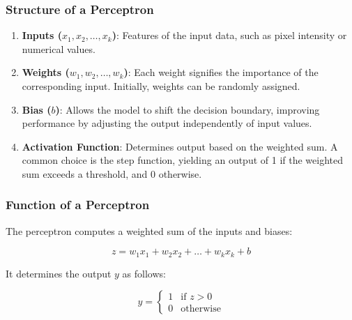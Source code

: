 \documentclass[aspectratio=169]{beamer}
\begin{document}
\begin{frame}[fragile]
    \frametitle{Structure of a Perceptron}
    \begin{enumerate}
        \item \textbf{Inputs ($x_1, x_2, \ldots, x_k$)}: Features of the input data, such as pixel intensity or numerical values.
        
        \item \textbf{Weights ($w_1, w_2, \ldots, w_k$)}: Each weight signifies the importance of the corresponding input. Initially, weights can be randomly assigned.
        
        \item \textbf{Bias ($b$)}: Allows the model to shift the decision boundary, improving performance by adjusting the output independently of input values.
        
        \item \textbf{Activation Function}: Determines output based on the weighted sum. A common choice is the step function, yielding an output of 1 if the weighted sum exceeds a threshold, and 0 otherwise.
    \end{enumerate}
\end{frame}

\begin{frame}[fragile]
    \frametitle{Function of a Perceptron}
    The perceptron computes a weighted sum of the inputs and biases:

    \begin{equation}
        z = w_1x_1 + w_2x_2 + \ldots + w_kx_k + b
    \end{equation}

    It determines the output \(y\) as follows:

    \begin{equation}
        y = 
        \begin{cases} 
        1 & \text{if } z > 0 \\ 
        0 & \text{otherwise} 
        \end{cases}
    \end{equation}
\end{frame}
\end{document}
